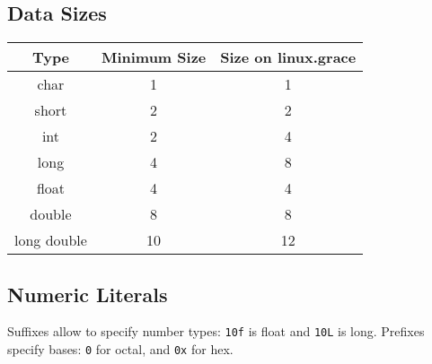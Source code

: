 \documentclass[11pt]{article}
\begin{document}
	\subsection{Data Sizes}
		\begin{center}
		\begin{tabular}{ccc}
			Type	&	Minimum Size	&	Size on linux.grace\\\hline
			char	&	1				&	1\\
			short	&	2				&	2\\
			int		&	2				&	4\\
			long	&	4				&	8\\
			float	&	4				&	4\\
			double	&	8				&	8\\
			long double	&	10			&	12
		\end{tabular}
		\end{center}
		
	\subsection{Numeric Literals}
	Suffixes allow to specify number types: \verb|10f| is float and \verb|10L| is long. Prefixes specify bases: \verb|0| for octal, and \verb|0x| for hex.
	
%		
%		


\end{document}
